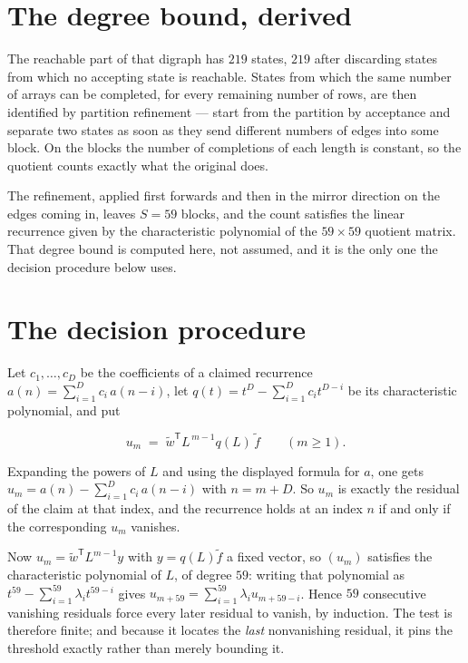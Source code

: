 \documentclass[11pt]{article}
\theoremstyle{definition}
\begin{document}
\section{The degree bound, derived}

The reachable part of that digraph has $219$ states, $219$ after discarding states from which no accepting state is reachable. States from which the same number of arrays can be completed, for every remaining number of rows, are then identified by partition refinement --- start from the partition by acceptance and separate two states as soon as they send different numbers of edges into some block. On the blocks the number of completions of each length is constant, so the quotient counts exactly what the original does.

The refinement, applied first forwards and then in the mirror direction on the edges coming in, leaves $S = 59$ blocks, and the count satisfies the linear recurrence given by the characteristic polynomial of the $59 \times 59$ quotient matrix. That degree bound is computed here, not assumed, and it is the only one the decision procedure below uses.

\section{The decision procedure}

Let $c_1,\dots,c_D$ be the coefficients of a claimed recurrence $a(n) = \sum_{i=1}^{D} c_i\,a(n-i)$, let $q(t) = t^{D} - \sum_{i=1}^{D} c_i t^{D-i}$ be its characteristic polynomial, and put

\[u_m \;=\; \tilde w^{\mathsf T} L^{\,m-1} q(L)\,\tilde f \qquad (m \ge 1).\]

Expanding the powers of $L$ and using the displayed formula for $a$, one gets $u_m = a(n) - \sum_{i=1}^{D} c_i\,a(n-i)$ with $n = m + D$. So $u_m$ is exactly the residual of the claim at that index, and the recurrence holds at an index $n$ if and only if the corresponding $u_m$ vanishes.

Now $u_m = \tilde w^{\mathsf T} L^{m-1} y$ with $y = q(L)\tilde f$ a fixed vector, so $(u_m)$ satisfies the characteristic polynomial of $L$, of degree $59$: writing that polynomial as $t^{59} - \sum_{i=1}^{59} \lambda_i t^{59-i}$ gives $u_{m+59} = \sum_{i=1}^{59} \lambda_i u_{m+59-i}$. Hence $59$ consecutive vanishing residuals force every later residual to vanish, by induction. The test is therefore finite; and because it locates the {\itshape last} nonvanishing residual, it pins the threshold exactly rather than merely bounding it.
\end{document}
